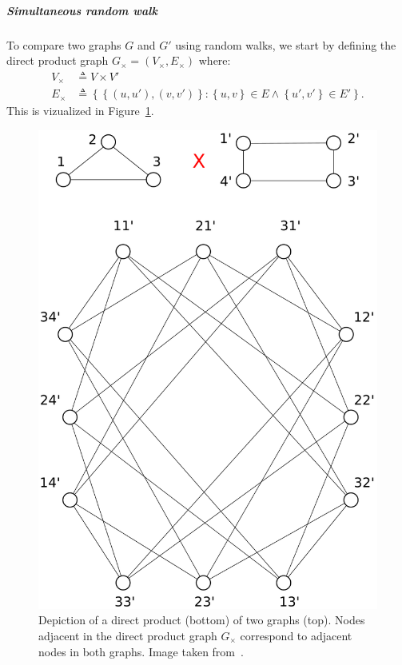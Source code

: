                 \subparagraph{Simultaneous random walk}
                    To compare two graphs \(G\) and \(G'\) using random walks, we start by defining the direct product graph $G_{\times} = \left(V_{\times}, E_{\times}\right)$ where:
                    \begin{align}
                        \label{eq::direct_product_graph}
                        V_{\times} &\triangleq V \times V'\\
                        E_{\times} &\triangleq \left\{\left\{(u, u'), (v, v')\right\}: \left\{u,v\right\} \in E \wedge \left\{u',v'\right\} \in E'\right\}.
                    \end{align}
                    This is vizualized in Figure~\ref{fig::direct_product_graph}.
                    \begin{figure}[htbp]
                        \centering
                        \includegraphics[height=.4\textheight]{images/related_work/direct_product_graphs}
                        \caption[
                            Depiction of a direct product of two graphs.
                        ]{
                            \label{fig::direct_product_graph}
                            Depiction of a direct product (bottom) of two graphs (top).
                            Nodes adjacent in the direct product graph $G_{\times}$ correspond to adjacent nodes in both graphs.
                            Image taken from~\parencite{vishwanathan2010graph}.
                        }
                    \end{figure}

